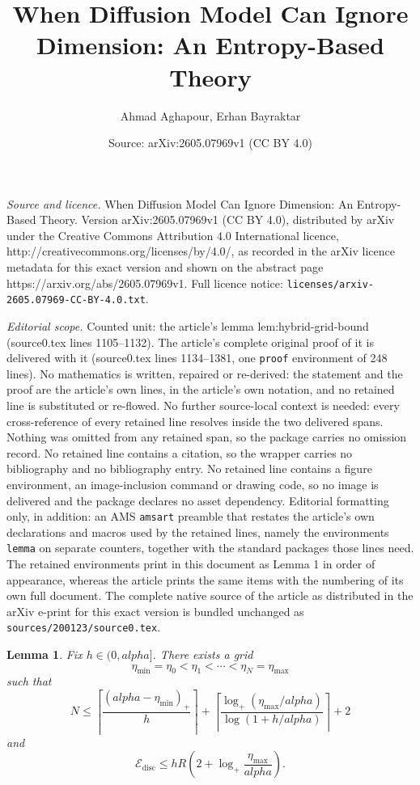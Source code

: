 \documentclass[10pt,a4paper]{amsart}
\title{When Diffusion Model Can Ignore Dimension: An Entropy-Based Theory}
\author{Ahmad Aghapour, Erhan Bayraktar}
\date{Source: arXiv:2605.07969v1 (CC BY 4.0)}
\newtheorem{lemma}{Lemma}
\def\alpha{alpha}%
\begin{document}
\maketitle

\noindent\emph{Source and licence.} When Diffusion Model Can Ignore Dimension: An Entropy-Based Theory. Version arXiv:2605.07969v1 (CC BY 4.0), distributed by arXiv under the Creative Commons Attribution 4.0 International licence, http://creativecommons.org/licenses/by/4.0/, as recorded in the arXiv licence metadata for this exact version and shown on the abstract page https://arxiv.org/abs/2605.07969v1. Full licence notice: \texttt{licenses/arxiv-2605.07969-CC-BY-4.0.txt}.\par\smallskip

\noindent\textit{Editorial scope.} Counted unit: the article's lemma lem:hybrid-grid-bound (source0.tex lines 1105--1132). The article's complete original proof of it is delivered with it (source0.tex lines 1134--1381, one \texttt{proof} environment of 248 lines). No mathematics is written, repaired or re-derived: the statement and the proof are the article's own lines, in the article's own notation, and no retained line is substituted or re-flowed.  No further source-local context is needed: every cross-reference of every retained line resolves inside the two delivered spans.  Nothing was omitted from any retained span, so the package carries no omission record.  No retained line contains a citation, so the wrapper carries no bibliography and no bibliography entry.  No retained line contains a figure environment, an image-inclusion command or drawing code, so no image is delivered and the package declares no asset dependency.  Editorial formatting only, in addition: an AMS \texttt{amsart} preamble that restates the article's own declarations and macros used by the retained lines, namely the environments \texttt{lemma} on separate counters, together with the standard packages those lines need.  The retained environments print in this document as Lemma 1 in order of appearance, whereas the article prints the same items with the numbering of its own full document.  The complete native source of the article as distributed in the arXiv e-print for this exact version is bundled unchanged as \texttt{sources/200123/source0.tex}.
\begin{lemma}
\label{lem:hybrid-grid-bound}
Fix $h\in(0,\alpha]$. There exists a grid
\[
    \eta_{\min}=\eta_0<\eta_1<\cdots<\eta_N=\eta_{\max}
\]
such that
\[
    N
    \le
    \left\lceil \frac{(\alpha-\eta_{\min})_+}{h}\right\rceil
    +
    \left\lceil
    \frac{\log_+(\eta_{\max}/\alpha)}
    {\log(1+h/\alpha)}
    \right\rceil
    +2
\]
and
\[
    \mathcal E_{\mathrm{disc}}
    \le
    hR
    \left(
    2+\log_+\frac{\eta_{\max}}{\alpha}
    \right).
\]
\end{lemma}
\end{document}
